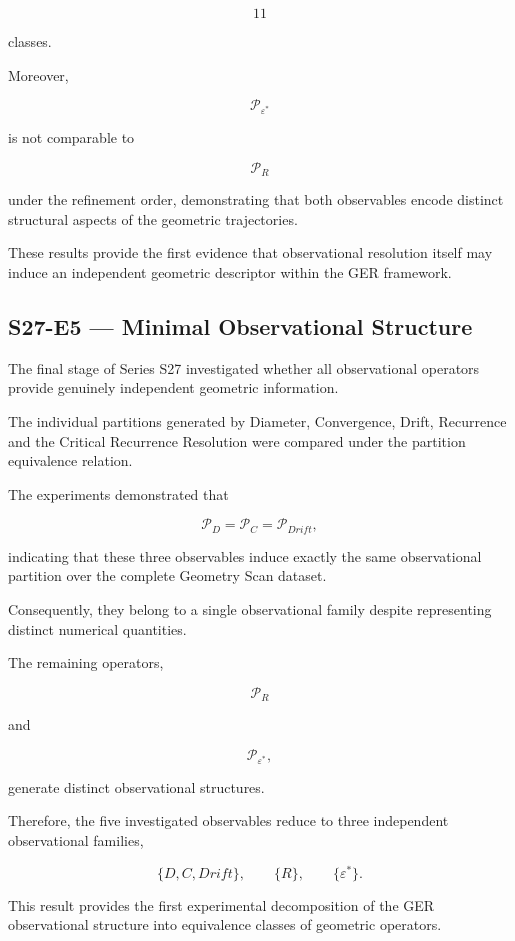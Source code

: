\[
11
\]

classes.

Moreover,

\[
\mathcal P_{\varepsilon^\ast}
\]

is not comparable to

\[
\mathcal P_R
\]

under the refinement order, demonstrating that both observables encode distinct structural aspects of the geometric trajectories.

These results provide the first evidence that observational resolution itself may induce an independent geometric descriptor within the GER framework.


\subsection{S27-E5 --- Minimal Observational Structure}

The final stage of Series S27 investigated whether all observational operators provide genuinely independent geometric information.

The individual partitions generated by Diameter, Convergence, Drift, Recurrence and the Critical Recurrence Resolution were compared under the partition equivalence relation.

The experiments demonstrated that

\[
\mathcal P_D
=
\mathcal P_C
=
\mathcal P_{Drift},
\]

indicating that these three observables induce exactly the same observational partition over the complete Geometry Scan dataset.

Consequently, they belong to a single observational family despite representing distinct numerical quantities.

The remaining operators,

\[
\mathcal P_R
\]

and

\[
\mathcal P_{\varepsilon^\ast},
\]

generate distinct observational structures.

Therefore, the five investigated observables reduce to three independent observational families,

\[
\{
D,
C,
Drift
\},
\qquad
\{
R
\},
\qquad
\{
\varepsilon^\ast
\}.
\]

This result provides the first experimental decomposition of the GER observational structure into equivalence classes of geometric operators.


